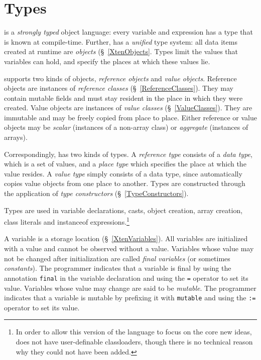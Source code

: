 \chapter{Types}
\label{XtenTypes}

{}\Xten{} is a {\em strongly typed} object language: every variable
and expression has a type that is known at compile-time. Further,
\Xten{} has a {\em unified} type system: all data items created at
runtime are {\em objects} (\S~\ref{XtenObjects}. Types limit the
values that variables can hold, and specify the places at which these
values lie.

{}\Xten{} supports two kinds of objects, {\em reference objects} and
{\em value objects}.  Reference objects are instances of {\em
reference classes} (\S~\ref{ReferenceClasses}). They may contain
mutable fields and must stay resident in the place in which they were
created. Value objects are instances of {\em value classes}
(\S~\ref{ValueClasses}). They are immutable and may be freely copied
from place to place. Either reference or value objects may be 
{\em scalar} (instances of a non-array class) or {\em aggregate} (instances
of arrays).

Correspondingly, \Xten{} has two kinds of types. A {\em reference
type} consists of a {\em data type}, which is a set of values, and a
{\em place type} which specifies the place at which the value
resides. A {\em value type} simply consists of a data type, since
\Xten{} automatically copies value objects from one place to
another. Types are constructed through the application of {\em type
constructors} (\S~\ref{TypeConstructors}).

Types are used in variable declarations, casts, object creation, array
creation, class literals and {\cf instanceof} expressions.\footnote{In
order to allow this version of the language to focus on the core new
ideas, \XtenCurrVer{} does not have user-definable classloaders,
though there is no technical reason why they could not have been
added.}

A variable is a storage location (\S~\ref{XtenVariables}). All
variables are initialized with a value and cannot be observed without
a value. Variables whose value may not be changed after initialization
are called {\em final variables} (or sometimes {\em constants}). The
programmer indicates that a variable is final by using the annotation
{\tt final} in the variable declaration and using the {\tt =} operator
to set its value. Variables whose value may change are said to be {\em
mutable}. The programmer indicates that a variable is mutable by
prefixing it with {\tt mutable} and using the {\tt :=} operator to set
its value.


